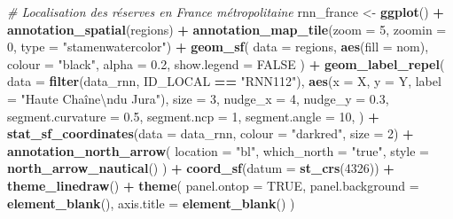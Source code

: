\documentclass[
  french,
]{book}
\newenvironment{Shaded}{\begin{snugshade}}{\end{snugshade}}
\newcommand{\CharTok}[1]{\textcolor[rgb]{0.31,0.60,0.02}{#1}}
\newcommand{\CommentTok}[1]{\textcolor[rgb]{0.56,0.35,0.01}{\textit{#1}}}
\newcommand{\DataTypeTok}[1]{\textcolor[rgb]{0.13,0.29,0.53}{#1}}
\newcommand{\DecValTok}[1]{\textcolor[rgb]{0.00,0.00,0.81}{#1}}
\newcommand{\FloatTok}[1]{\textcolor[rgb]{0.00,0.00,0.81}{#1}}
\newcommand{\KeywordTok}[1]{\textcolor[rgb]{0.13,0.29,0.53}{\textbf{#1}}}
\newcommand{\NormalTok}[1]{#1}
\newcommand{\OperatorTok}[1]{\textcolor[rgb]{0.81,0.36,0.00}{\textbf{#1}}}
\newcommand{\OtherTok}[1]{\textcolor[rgb]{0.56,0.35,0.01}{#1}}
\newcommand{\StringTok}[1]{\textcolor[rgb]{0.31,0.60,0.02}{#1}}
\begin{document}
\begin{Shaded}
\begin{Highlighting}[]
\CommentTok{\# Localisation des réserves en France métropolitaine}
\NormalTok{rnn\_france \textless{}{-}}\StringTok{ }\KeywordTok{ggplot}\NormalTok{() }\OperatorTok{+}
\StringTok{  }\KeywordTok{annotation\_spatial}\NormalTok{(regions) }\OperatorTok{+}
\StringTok{  }\KeywordTok{annotation\_map\_tile}\NormalTok{(}\DataTypeTok{zoom =} \DecValTok{5}\NormalTok{, }\DataTypeTok{zoomin =} \DecValTok{0}\NormalTok{, }\DataTypeTok{type =} \StringTok{"stamenwatercolor"}\NormalTok{) }\OperatorTok{+}
\StringTok{  }\KeywordTok{geom\_sf}\NormalTok{(}
    \DataTypeTok{data =}\NormalTok{ regions,}
    \KeywordTok{aes}\NormalTok{(}\DataTypeTok{fill =}\NormalTok{ nom),}
    \DataTypeTok{colour =} \StringTok{"black"}\NormalTok{,}
    \DataTypeTok{alpha =} \FloatTok{0.2}\NormalTok{,}
    \DataTypeTok{show.legend =} \OtherTok{FALSE}
\NormalTok{  ) }\OperatorTok{+}
\StringTok{  }\KeywordTok{geom\_label\_repel}\NormalTok{(}
    \DataTypeTok{data =} \KeywordTok{filter}\NormalTok{(data\_rnn, ID\_LOCAL }\OperatorTok{==}\StringTok{ "RNN112"}\NormalTok{),}
    \KeywordTok{aes}\NormalTok{(}\DataTypeTok{x =}\NormalTok{ X, }\DataTypeTok{y =}\NormalTok{ Y, }\DataTypeTok{label =} \StringTok{"Haute Chaîne}\CharTok{\textbackslash{}n}\StringTok{du Jura"}\NormalTok{),}
    \DataTypeTok{size =} \DecValTok{3}\NormalTok{,}
    \DataTypeTok{nudge\_x =} \DecValTok{4}\NormalTok{,}
    \DataTypeTok{nudge\_y =} \FloatTok{0.3}\NormalTok{,}
    \DataTypeTok{segment.curvature =} \FloatTok{0.5}\NormalTok{,}
    \DataTypeTok{segment.ncp =} \DecValTok{1}\NormalTok{,}
    \DataTypeTok{segment.angle =} \DecValTok{10}\NormalTok{,}
\NormalTok{  ) }\OperatorTok{+}
\StringTok{  }\KeywordTok{stat\_sf\_coordinates}\NormalTok{(}\DataTypeTok{data =}\NormalTok{ data\_rnn, }\DataTypeTok{colour =} \StringTok{"darkred"}\NormalTok{, }\DataTypeTok{size =} \DecValTok{2}\NormalTok{) }\OperatorTok{+}
\StringTok{  }\KeywordTok{annotation\_north\_arrow}\NormalTok{(}
    \DataTypeTok{location =} \StringTok{"bl"}\NormalTok{,}
    \DataTypeTok{which\_north =} \StringTok{"true"}\NormalTok{,}
    \DataTypeTok{style =} \KeywordTok{north\_arrow\_nautical}\NormalTok{()}
\NormalTok{  ) }\OperatorTok{+}
\StringTok{  }\KeywordTok{coord\_sf}\NormalTok{(}\DataTypeTok{datum =} \KeywordTok{st\_crs}\NormalTok{(}\DecValTok{4326}\NormalTok{)) }\OperatorTok{+}
\StringTok{  }\KeywordTok{theme\_linedraw}\NormalTok{() }\OperatorTok{+}
\StringTok{  }\KeywordTok{theme}\NormalTok{(}
    \DataTypeTok{panel.ontop =} \OtherTok{TRUE}\NormalTok{,}
    \DataTypeTok{panel.background =} \KeywordTok{element\_blank}\NormalTok{(),}
    \DataTypeTok{axis.title =} \KeywordTok{element\_blank}\NormalTok{()}
\NormalTok{  )}


\end{Highlighting}
\end{Shaded}
\end{document}
